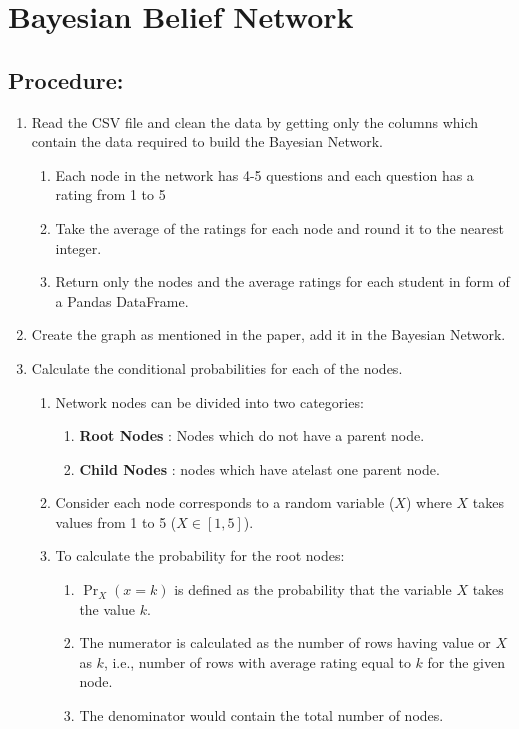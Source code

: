 \documentclass{article}
\begin{document}
\section{Bayesian Belief Network}
\subsection{Procedure:}
\begin{enumerate}
  \item Read the CSV file and clean the data by getting only the columns which contain the data required to build the Bayesian Network.
  \begin{enumerate}
    \item Each node in the network has 4-5 questions and each question has a rating from 1 to 5
    \item Take the average of the ratings for each node and round it to the nearest integer.
    \item Return only the nodes and the average ratings for each student in form of a Pandas DataFrame.
  \end{enumerate}
  \item  Create the graph as mentioned in the paper, add it in the Bayesian Network.
  \item Calculate the conditional probabilities for each of the nodes.
  \begin{enumerate}
    \item Network nodes can be divided into two categories:
    \begin{enumerate}
      \item \textbf{Root Nodes} : Nodes which do not have a parent node.
      \item \textbf{Child Nodes} : nodes which have atelast one parent node.
    \end{enumerate}
    \item Consider each node corresponds to a random variable ($X$) where $X$ takes values from 1 to 5 ($X\in[1,5]$).  
    \item To calculate the probability for the root nodes:
    \begin{enumerate}
      \item $\Pr_X(x=k)$ is defined as the probability that the variable $X$ takes the value $k$. 
      \item The numerator is calculated as the number of rows having value or $X$ as $k$, i.e., number of rows with average rating equal to $k$ for the given node.
      \item The denominator would contain the total number of nodes.

\end{enumerate}
\end{enumerate}
\end{enumerate}
\end{document}
